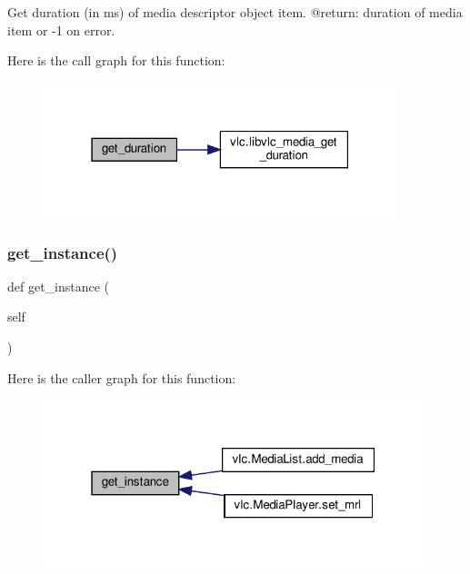 \begin{DoxyVerb}Get duration (in ms) of media descriptor object item.
@return: duration of media item or -1 on error.
\end{DoxyVerb}
 Here is the call graph for this function\+:
\nopagebreak
\begin{figure}[H]
\begin{center}
\leavevmode
\includegraphics[width=291pt]{classvlc_1_1_media_a2915bf55d38ef271444cdba23ba59f2f_cgraph}
\end{center}
\end{figure}
\mbox{\label{classvlc_1_1_media_a56c15bafa43c856366863fc07fc4021f}} 
\subsubsection{\texorpdfstring{get\+\_\+instance()}{get\_instance()}}
{\footnotesize\ttfamily def get\+\_\+instance (\begin{DoxyParamCaption}\item[{}]{self }\end{DoxyParamCaption})}

Here is the caller graph for this function\+:
\nopagebreak
\begin{figure}[H]
\begin{center}
\leavevmode
\includegraphics[width=313pt]{classvlc_1_1_media_a56c15bafa43c856366863fc07fc4021f_icgraph}
\end{center}
\end{figure}
\mbox{\label{classvlc_1_1_media_ae1d2cbf8cdcc58f21b6233ceb681bac6}} 
